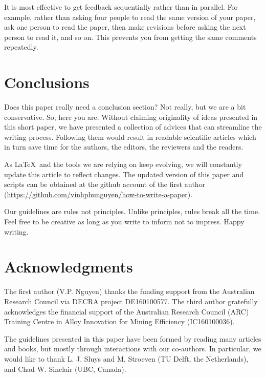 \documentclass[authoryear,3p,times,preprint,review,fleqn]{elsarticle}
\numberwithin{equation}{section}
\theoremstyle{remark}
\begin{document}
It is most effective to get feedback sequentially rather than in parallel. For example, rather than asking four people to read the same version of your paper, ask one person to read the paper, then make revisions before asking the next person to read it, and so on. This prevents you from getting the same comments repeatedly.


\section{Conclusions}

Does this paper really need a conclusion section? Not really, but we are a bit conservative. So, here you are. Without claiming  originality of ideas presented in this short paper, we have presented a collection of  advices that can streamline the writing process. Following them would result in readable scientific articles which in turn save time for the authors,  the editors, the reviewers and the readers.


As \LaTeX\ and the tools we are relying on keep evolving, we will constantly update this article to reflect changes. The updated version of this paper and scripts can be obtained at the github account of the first author (\url{https://github.com/vinhphunguyen/how-to-write-a-paper}).

Our guidelines are rules not principles. Unlike principles, rules break all the time. Feel free to be creative as long as you write to inform not to impress. Happy writing.

%
\section*{Acknowledgments}

 The first author (V.P. Nguyen) thanks the funding support from the Australian Research Council via DECRA project DE160100577.  The third  author gratefully acknowledges the financial support of the Australian Research Council (ARC) Training Centre in Alloy Innovation for Mining Efficiency (IC160100036).

 The guidelines presented in this paper have been formed by reading many articles and books, but mostly through interactions with our co-authors. In particular, we would like to thank L. J. Sluys and M. Stroeven (TU Delft, the Netherlands), and Chad W. Sinclair (UBC, Canada).
\end{document}
